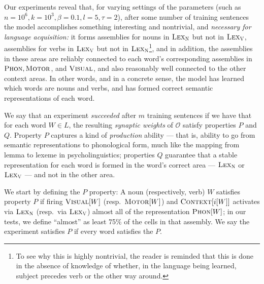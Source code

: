 \documentclass{article}
\newcommand{\LexV}{\textsc{Lex}_{\textsc{V}}}
\newcommand{\LexN}{\textsc{Lex}_{\textsc{N}}}
\newcommand{\Phon}{\textsc{Phon}}
\newcommand{\Context}{\textsc{Context}}
\newcommand{\Visual}{\textsc{Visual}}
\newcommand{\Motor}{\textsc{Motor}}
\begin{document}
Our experiments reveal that, for varying settings of the parameters (such as $n=10^6, k=10^3, \beta =0.1, l=5, \tau=2$), after some number of training sentences the model accomplishes something interesting and nontrivial, and \emph{necessary for language acquisition:} it forms assemblies for nouns in $\LexN$ but not in $\LexV$,  assemblies for verbs in $\LexV$ but not in $\LexN$\footnote{To see why this is highly nontrivial, the reader is reminded that this is done in the absence of knowledge of whether, in the language being learned, subject precedes verb or the other way around.}, and in addition, the assemblies in these areas are reliably connected to each word's corresponding assemblies in $\Phon,\Motor$, and $\Visual$, and also reasonably well connected to the other context areas. In other words, and in a concrete sense, the model has learned which words are nouns and verbs, and has formed correct semantic representations of each word.  %

We say that an experiment \emph{succeeded} after $m$ training sentences if we have that for each word $W \in L$, the resulting \emph{ synaptic weights} of $\mathcal{O}$  satisfy properties $P$ and $Q$. Property $P$ captures a kind of {\em production} ability --- that is, ability to go from semantic representations to phonological form, much like the mapping from lemma to lexeme in psycholinguistics; properties $Q$ guarantee that a stable representation for each word is formed in the word's correct area --- $\LexN$ or $\LexV$ --- and not in the other area.

We start by defining the $P$ property: A noun (respectively, verb) $W$ satisfies property $P$ if firing $\Visual[W]$ (resp.~$\Motor[W]$) and $\Context[i[W]]$ activates via $\LexN$ (resp.~via $\LexV$) almost all of the representation $\Phon[W]$; in our tests, we define ``almost'' as least 75\% of the cells in that assembly. We say the experiment satisfies $P$ if every word satisfies the $P$.
\end{document}
